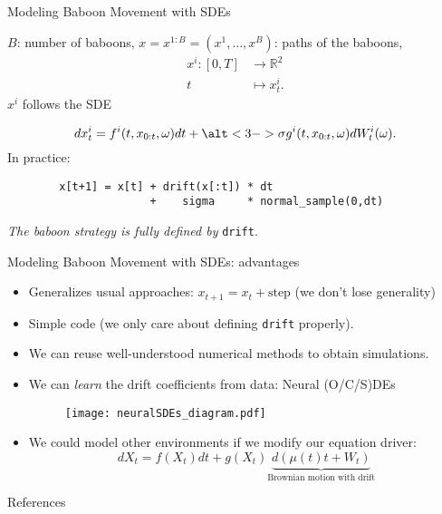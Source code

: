 \documentclass[
    aspectratio=149,
    10pt,
]{beamer}
\begin{document}
\begin{frame}[fragile]{Modeling Baboon Movement with SDEs}
    
        
    \(B\): number of baboons, \(x = x^{1:B} = (x^1, \dots, x^B)\): paths of the baboons,
    \begin{align*}
        x^i:[0, T] &\to \mathbb R^2\\
        t&\mapsto x^i_t.
    \end{align*} \pause
    \(    x^i    \) follows the SDE
    
    \begin{equation}
        dx^i_t = f^i(t, x_{0:t}, \omega) dt + \alt<3->{\sigma}{g^i(t, x_{0:t}, \omega)} dW^i_t(\omega).
    \end{equation}
    \pause
    In practice:
    \begin{verbatim}
        x[t+1] = x[t] + drift(x[:t]) * dt
                      +    sigma     * normal_sample(0,dt)
    \end{verbatim}
    \pause
    \begin{center} 
        \emph{The baboon strategy is fully defined by} {\texttt{drift}}.
    \end{center}
\end{frame}
\begin{frame}[fragile]{Modeling Baboon Movement with SDEs: advantages}
    \begin{itemize}
        \item Generalizes usual approaches: \(x_{t+1} = x_t + \text{step}\) (we don't lose generality)
        \pause
        \item Simple code \pause (we only care about defining \texttt{drift} properly).
        \pause 
        \item We can reuse well-understood numerical methods to obtain simulations.
        \pause 
        \item We can \emph{learn} the drift coefficients from data: Neural (O/C/S)DEs \cite{chen2019neuralordinarydifferentialequations, kidger2021neuralsdesinfinitedimensionalgans}
        \pause
        \begin{figure}
            \centering
            \texttt{[image: neuralSDEs\_diagram.pdf]}
        \end{figure}
        \pause
        \item We could model other environments if we modify our equation driver:
        \[
            dX_t = f(X_t) dt + g(X_t) \underbrace{d(\mu(t) t + W_t)}_{\text{Brownian motion with drift}}
        \]
    \end{itemize}
\end{frame}

\begin{frame}{References}

\nocite{*}
\printbibliography
    
\end{frame}
\end{document}
